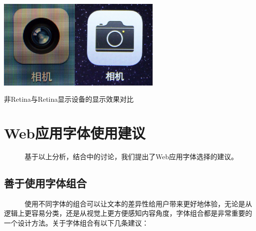 \documentclass[a4paper]{article}
\begin{document}
~~

\makeatletter
\def\@captype{figure}
\makeatother
\centerline{\includegraphics [width=0.6\textwidth]{mxw6.png} }
\caption{ 非Retina与Retina显示设备的显示效果对比}
\label{mxw6}

\section{Web应用字体使用建议}

~~~~~~基于以上分析，结合\cite{lj1}中的讨论，我们提出了Web应用字体选择的建议。

\subsection{善于使用字体组合}

~~~~~~使用不同字体的组合可以让文本的差异性给用户带来更好地体验，无论是从逻辑上更容易分类，还是从视觉上更方便感知内容角度，字体组合都是非常重要的一个设计方法。关于字体组合有以下几条建议：
\end{document}
